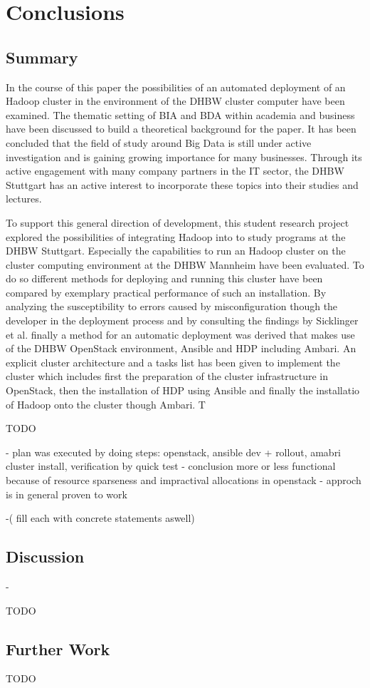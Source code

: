 \chapter{Conclusions}
\label{chap:conc}

\section{Summary}

In the course of this paper the possibilities of an automated deployment of an Hadoop cluster in the environment of the \ac{DHBW} cluster computer have been examined.
The thematic setting of \ac{BIA} and \ac{BDA} within academia and business have been discussed to build a theoretical background for the paper. 
It has been concluded that the field of study around Big Data is still under active investigation and is gaining growing importance for many businesses.
Through its active engagement with many company partners in the \ac{IT} sector, the \ac{DHBW} Stuttgart has an active interest to incorporate these topics into their studies and lectures.

To support this general direction of development, this student research project explored the possibilities of integrating Hadoop into to study programs at the \ac{DHBW} Stuttgart.
Especially the capabilities to run an Hadoop cluster on the cluster computing environment at the \ac{DHBW Mannheim} have been evaluated.
To do so different methods for deploying and running this cluster have been compared 
by exemplary practical performance of such an installation. 
By analyzing the susceptibility to errors caused by misconfiguration though the developer in the deployment process and by consulting the findings by Sicklinger et al. finally a method for an automatic deployment was derived that makes use of the \ac{DHBW} OpenStack environment, Ansible and \acf{HDP} including Ambari.
An explicit cluster architecture and a tasks list has been given to implement the cluster which includes first the preparation of the cluster infrastructure in OpenStack, then the installation of \ac{HDP} using Ansible and finally the installatio of Hadoop onto the cluster though Ambari.
T

TODO

- plan was executed by doing steps: openstack, ansible dev + rollout, amabri cluster install, verification by quick test
- conclusion more or less functional because of resource sparseness and impractival allocations in openstack
- approch is in general proven to work

-( fill each with concrete statements aswell)

\section{Discussion}

- 

TODO

\section{Further Work}

TODO
